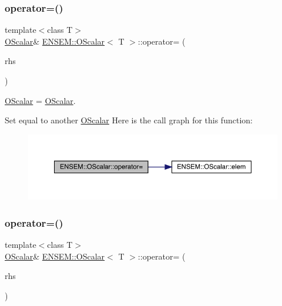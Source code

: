 \subsubsection{\texorpdfstring{operator=()}{operator=()}\hspace{0.1cm}{\footnotesize\ttfamily [5/8]}}
{\footnotesize\ttfamily template$<$class T$>$ \\
\mbox{\hyperlink{classENSEM_1_1OScalar}{O\+Scalar}}\& \mbox{\hyperlink{classENSEM_1_1OScalar}{E\+N\+S\+E\+M\+::\+O\+Scalar}}$<$ T $>$\+::operator= (\begin{DoxyParamCaption}\item[{const \mbox{\hyperlink{classENSEM_1_1OScalar}{O\+Scalar}}$<$ T $>$ \&}]{rhs }\end{DoxyParamCaption})\hspace{0.3cm}{\ttfamily [inline]}}



\mbox{\hyperlink{classENSEM_1_1OScalar}{O\+Scalar}} = \mbox{\hyperlink{classENSEM_1_1OScalar}{O\+Scalar}}. 

Set equal to another \mbox{\hyperlink{classENSEM_1_1OScalar}{O\+Scalar}} Here is the call graph for this function\+:
\nopagebreak
\begin{figure}[H]
\begin{center}
\leavevmode
\includegraphics[width=350pt]{da/d80/classENSEM_1_1OScalar_a7c36649387edf21f3fa19f9ae63d4aca_cgraph}
\end{center}
\end{figure}
\mbox{\label{classENSEM_1_1OScalar_a7c36649387edf21f3fa19f9ae63d4aca}} 
\subsubsection{\texorpdfstring{operator=()}{operator=()}\hspace{0.1cm}{\footnotesize\ttfamily [6/8]}}
{\footnotesize\ttfamily template$<$class T$>$ \\
\mbox{\hyperlink{classENSEM_1_1OScalar}{O\+Scalar}}\& \mbox{\hyperlink{classENSEM_1_1OScalar}{E\+N\+S\+E\+M\+::\+O\+Scalar}}$<$ T $>$\+::operator= (\begin{DoxyParamCaption}\item[{const \mbox{\hyperlink{classENSEM_1_1OScalar}{O\+Scalar}}$<$ T $>$ \&}]{rhs }\end{DoxyParamCaption})\hspace{0.3cm}{\ttfamily [inline]}}



